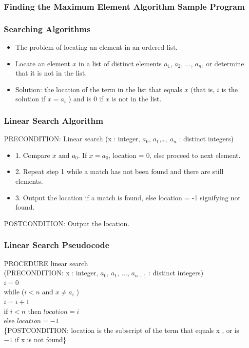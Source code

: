 \documentclass{beamer}
\begin{document}
\begin{frame}
\frametitle{\huge Finding the Maximum Element Algorithm Sample Program}
\end{frame} 


\begin{frame}
\frametitle{\huge Searching Algorithms}
\begin{itemize} 
\Large
\item <1-> The problem of locating an element in an ordered list.
\item <2-> Locate an element $x$ in a list of distinct elements $a_1$, $a_2$, $\ldots$, $a_n$, or determine that it is not in the list.
\item <3-> Solution: the location of the term in the list that equals $x$ (that is, $i$ is the solution if $x = a_i$ ) and is $0$ if $x$ is not in the list.
\end{itemize}
\end{frame}


\begin{frame}
\frametitle{\huge Linear Search Algorithm}
PRECONDITION: Linear search  (x : integer, $a_0$, $a_1$,\ldots, $a_n$ : distinct integers) 
\begin{itemize} 
\Large
\item <1-> 1. Compare $x$ and $a_0$. If $x = a_0$, location = $0$, else proceed to next element.
\item <2-> 2. Repeat step 1 while a match has not been found and there are still elements.
\item <3-> 3. Output the location if a match is found, else location = -1 signifying not found.
\end{itemize}
POSTCONDITION: Output the location. 
\end{frame}

\begin{frame}
\frametitle{\huge Linear Search Pseudocode}
\Large
PROCEDURE linear search \\ (PRECONDITION: x : integer, $a_0$, $a_1$, $\ldots$, $a_{n-1}$ : distinct integers) \\
\quad $i = 0$ \\
\quad while ($i < n$ and $x \ne a_i$ ) \\
\qquad $i= i + 1$ \\
\quad if $i < n$ then $location= i$ \\
\quad else $location = -1$ \\
\{POSTCONDITION: location is the subscript of the term that equals x , or is $-1$ if x is not found\}
 \end{frame}
\end{document}
